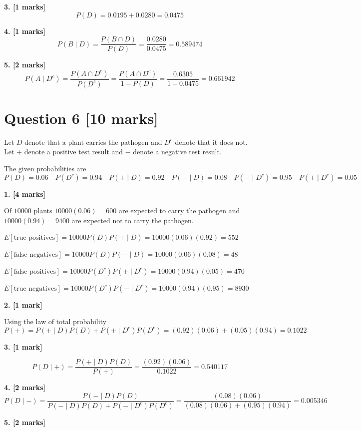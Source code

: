 \documentclass[10pt,letterpaper]{article}
\begin{document}
\textbf{3. [1 marks]}
$$P(D)=0.0195+0.0280=\boxed{0.0475}$$

\textbf{4. [1 marks]}
$$P(B\mid D)=\frac{P(B\cap D)}{P(D)}=\frac{0.0280}{0.0475}=\boxed{0.589474}$$

\textbf{5. [2 marks]}
$$P(A\mid D^c)=\frac{P(A\cap D^c)}{P(D^c)}=\frac{P(A\cap D^c)}{1-P(D)}=\frac{0.6305}{1-0.0475}=\boxed{0.661942}$$


\section*{Question 6 \hfill [10 marks]}

Let \(D\) denote that a plant carries the pathogen and \(D^c\) denote that it does not. Let \(+\) denote a positive test result and \(-\) denote a negative test result.

The given probabilities are
$$P(D)=0.06 \quad P(D^c)=0.94 \quad P(+\mid D)=0.92 \quad P(-\mid D)=0.08 \quad P(-\mid D^c)=0.95 \quad P(+\mid D^c)=0.05$$

\textbf{1. [4 marks]}

Of \(10000\) plants $10000(0.06)=600$ are expected to carry the pathogen and $10000(0.94)=9400$ are expected not to carry the pathogen. 

$E[\text{true positives}] = 10000P(D)P(+\mid D)=10000(0.06)(0.92)=\boxed{552}$

$E[\text{false negatives}] =10000P(D)P(-\mid D)=10000(0.06)(0.08)=\boxed{48}$

$E[\text{false positives}] =10000P(D^c)P(+\mid D^c)=10000(0.94)(0.05)=\boxed{470}$

$E[\text{true negatives}] =10000P(D^c)P(-\mid D^c)=10000(0.94)(0.95)=\boxed{8930}$

\textbf{2. [1 mark]}

Using the law of total probability
$$P(+)=P(+\mid D)P(D)+P(+\mid D^c)P(D^c)=(0.92)(0.06)+(0.05)(0.94)=\boxed{0.1022}$$

\textbf{3. [1 mark]}

$$P(D\mid +)=\frac{P(+\mid D)P(D)}{P(+)}=\frac{(0.92)(0.06)}{0.1022}=\boxed{0.540117}$$

\textbf{4. [2 marks]}
$$P(D\mid -)=\frac{P(-\mid D)P(D)}{P(-\mid D)P(D)+P(-\mid D^c)P(D^c)}=\frac{(0.08)(0.06)}{(0.08)(0.06)+(0.95)(0.94)}=\boxed{0.005346}$$

\textbf{5. [2 marks]}
\end{document}
